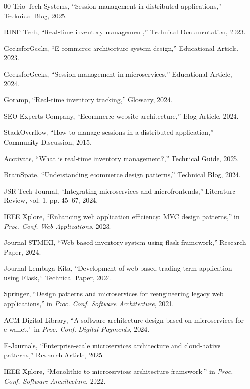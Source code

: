\documentclass[conference]{IEEEtran}
\begin{document}
\begin{thebibliography}{00}
 Trio Tech Systems, ``Session management in distributed applications,'' Technical Blog, 2025.

 RINF Tech, ``Real-time inventory management,'' Technical Documentation, 2023.

 GeeksforGeeks, ``E-commerce architecture system design,'' Educational Article, 2023.

 GeeksforGeeks, ``Session management in microservices,'' Educational Article, 2024.

 Goramp, ``Real-time inventory tracking,'' Glossary, 2024.

 SEO Experts Company, ``Ecommerce website architecture,'' Blog Article, 2024.

 StackOverflow, ``How to manage sessions in a distributed application,'' Community Discussion, 2015.

 Acctivate, ``What is real-time inventory management?,'' Technical Guide, 2025.

 BrainSpate, ``Understanding ecommerce design patterns,'' Technical Blog, 2024.

 JSR Tech Journal, ``Integrating microservices and microfrontends,'' Literature Review, vol. 1, pp. 45--67, 2024.

 IEEE Xplore, ``Enhancing web application efficiency: MVC design patterns,'' in \textit{Proc. Conf. Web Applications}, 2023.

 Journal STMIKI, ``Web-based inventory system using flask framework,'' Research Paper, 2024.

 Journal Lembaga Kita, ``Development of web-based trading term application using Flask,'' Technical Paper, 2024.

 Springer, ``Design patterns and microservices for reengineering legacy web applications,'' in \textit{Proc. Conf. Software Architecture}, 2021.

 ACM Digital Library, ``A software architecture design based on microservices for e-wallet,'' in \textit{Proc. Conf. Digital Payments}, 2024.

 E-Journals, ``Enterprise-scale microservices architecture and cloud-native patterns,'' Research Article, 2025.

 IEEE Xplore, ``Monolithic to microservices architecture framework,'' in \textit{Proc. Conf. Software Architecture}, 2022.


\end{thebibliography}
\end{document}
